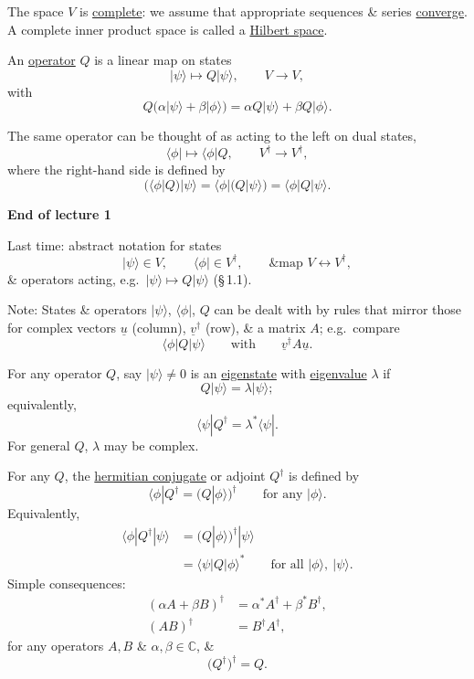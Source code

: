 \documentclass[11pt,a4paper]{article}
\begin{document}
The space $V$ is \underline{complete}: we assume that appropriate
sequences \& series \underline{converge}.
A complete inner product space is called a
\underline{Hilbert space}.

\medskip

An \underline{operator} $Q$ is a linear map on states
\[
    |\psi\rangle\longmapsto Q|\psi\rangle,
    \qquad
    V\to V,
\]
with
\[
    Q\bigl(\alpha|\psi\rangle+\beta|\phi\rangle\bigr)
    =
    \alpha Q|\psi\rangle+\beta Q|\phi\rangle.
\]

The same operator can be thought of as acting to the left on dual states,
\[
    \langle\phi|\longmapsto\langle\phi|Q,
    \qquad
    V^\dagger\to V^\dagger,
\]
where the right-hand side is defined by
\[
    \bigl(\langle\phi|Q\bigr)|\psi\rangle
    =
    \langle\phi|\bigl(Q|\psi\rangle\bigr)
    =
    \langle\phi|Q|\psi\rangle.
\]

\begin{center}
    \textbf{End of lecture 1}
\end{center}
Last time: abstract notation for states
\[
    |\psi\rangle\in V,
    \qquad
    \langle\phi|\in V^\dagger,
    \qquad
    \text{\& map }V\longleftrightarrow V^\dagger,
\]
\& operators acting, e.g.\ $|\psi\rangle\longmapsto Q|\psi\rangle$
(\S\,1.1).

\medskip

\noindent
Note: States \& operators $|\psi\rangle$, $\langle\phi|$, $Q$
can be dealt with by rules that mirror those for complex vectors
$\underline{u}$ (column), $\underline{v}^{\dagger}$ (row),
\& a matrix $A$; e.g.\ compare
\[
    \langle\phi|Q|\psi\rangle
    \qquad\text{with}\qquad
    \underline{v}^{\dagger}A\underline{u}.
\]

For any operator $Q$, say $|\psi\rangle\neq0$ is an
\underline{eigenstate} with \underline{eigenvalue} $\lambda$ if
\[
    Q|\psi\rangle=\lambda|\psi\rangle;
\]
equivalently,
\[
    \langle\psi|Q^\dagger=\lambda^*\langle\psi|.
\]
For general $Q$, $\lambda$ may be complex.

For any $Q$, the \underline{hermitian conjugate} or adjoint
$Q^\dagger$ is defined by
\[
    \langle\phi|Q^\dagger
    =\bigl(Q|\phi\rangle\bigr)^\dagger
    \qquad\text{for any }|\phi\rangle.
\]
Equivalently,
\begin{align*}
    \langle\phi|Q^\dagger|\psi\rangle
    &=\bigl(Q|\phi\rangle\bigr)^\dagger|\psi\rangle\\
    &=\langle\psi|Q|\phi\rangle^*
    \qquad\text{for all }|\phi\rangle,\ |\psi\rangle.
\end{align*}
Simple consequences:
\begin{align*}
    (\alpha A+\beta B)^\dagger
    &=\alpha^*A^\dagger+\beta^*B^\dagger,\\
    (AB)^\dagger&=B^\dagger A^\dagger,
\end{align*}
for any operators $A,B$ \& $\alpha,\beta\in\mathbb{C}$, \&
\[
    \bigl(Q^\dagger\bigr)^\dagger=Q.
\]
\end{document}
